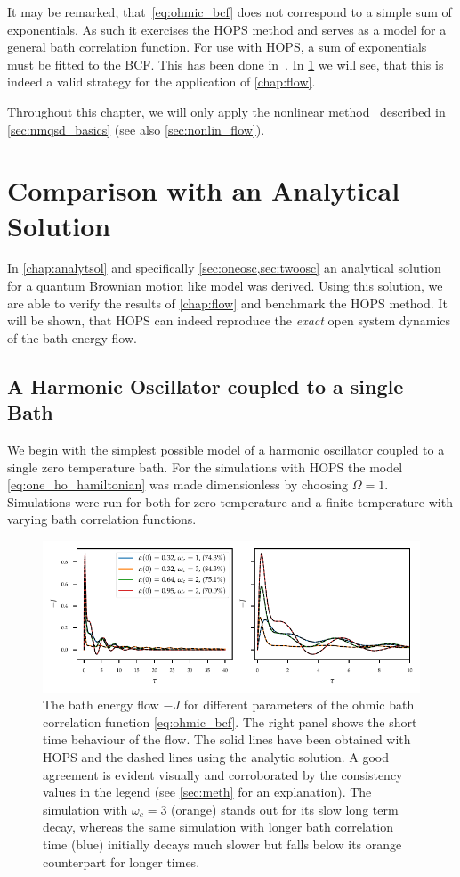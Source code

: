 It may be remarked, that~\cref{eq:ohmic_bcf} does not correspond to a
simple sum of exponentials. As such it exercises the HOPS method and
serves as a model for a general bath correlation function. For use
with HOPS, a sum of exponentials must be fitted to the BCF. This has
been done in~\cite{RichardDiss,Hartmann2021Aug}. In
\cref{sec:hopsvsanalyt} we will see, that this is indeed a valid
strategy for the application of \cref{chap:flow}.

Throughout this chapter, we will only apply the nonlinear
method~\cite{Hartmann2021Aug} described in \cref{sec:nmqsd_basics}
(see also \cref{sec:nonlin_flow}).

\section{Comparison with an Analytical Solution}
\label{sec:hopsvsanalyt}
In \cref{chap:analytsol} and specifically \cref{sec:oneosc,sec:twoosc}
an analytical solution for a quantum Brownian motion like model was
derived. Using this solution, we are able to verify the results of
\cref{chap:flow} and benchmark the HOPS method. It will be shown, that
HOPS can indeed reproduce the \emph{exact} open system dynamics of the
bath energy flow.

\subsection{A Harmonic Oscillator coupled to a single Bath}
\label{sec:oneosccomp}
We begin with the simplest possible model of a harmonic oscillator
coupled to a single zero temperature bath.  For the simulations with
HOPS the model \cref{eq:one_ho_hamiltonian} was made dimensionless by
choosing \(Ω=1\). Simulations were run for both for zero temperature
and a finite temperature with varying bath correlation functions.

\begin{figure}[t]
  \centering
  \includegraphics{figs/analytic_comp/flow_comp_zero.pdf}
  \caption{\label{fig:comp_zero_t} The bath energy flow \(-J\) for
    different parameters of the ohmic bath correlation function
    \cref{eq:ohmic_bcf}. The right panel shows the short time behaviour
    of the flow. The solid lines have been obtained with HOPS and the
    dashed lines using the analytic solution. A good agreement is
    evident visually and corroborated by the consistency values in the
    legend (see \cref{sec:meth} for an explanation).  The simulation
    with \(ω_{c}=3\) (orange) stands out for its slow long term decay,
    whereas the same simulation with longer bath correlation time
    (blue) initially decays much slower but falls below its orange
    counterpart for longer times.}
\end{figure}
